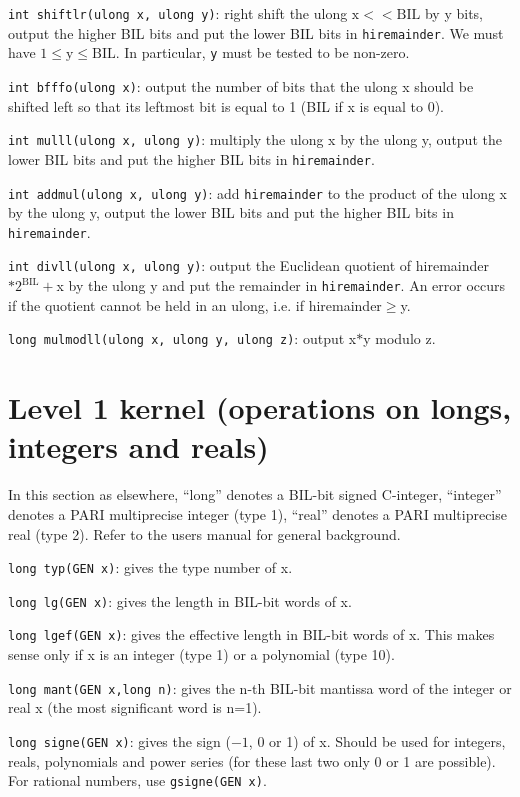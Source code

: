 {\tt int shiftlr(ulong x, ulong y)}: right shift the ulong $\text{x}<<\text{BIL}$ by
y bits, output the higher BIL bits and put the lower BIL bits in 
{\tt hiremainder}. We must have $1\le\text{y}\le\text{BIL}$. In
particular, {\tt y} must be tested to be non-zero.

{\tt int bfffo(ulong x)}: output the number of bits that the ulong x should
be shifted left so that its leftmost bit is equal to 1 (BIL if x is equal to 0).

{\tt int mulll(ulong x, ulong y)}: multiply the ulong x by the ulong y, output
the lower BIL bits and put the higher BIL bits in {\tt hiremainder}.

{\tt int addmul(ulong x, ulong y)}: add {\tt hiremainder} to the product of
the ulong x by the ulong y, output the lower BIL bits and put the higher BIL
bits in {\tt hiremainder}.

{\tt int divll(ulong x, ulong y)}: output the Euclidean quotient of 
hiremainder$*2^{\text{BIL}}+$x by the ulong y and put the remainder in 
{\tt hiremainder}. An error occurs if the quotient cannot be held in
an ulong, i.e. if hiremainder$\ge$y.

{\tt long mulmodll(ulong x, ulong y, ulong z)}: output x$*$y modulo z.

\section{Level 1 kernel (operations on longs, integers and reals)}
In this section as elsewhere, ``long'' denotes a BIL-bit signed C-integer,
``integer'' denotes a PARI multiprecise integer (type 1), ``real'' denotes
a PARI multiprecise real (type 2). Refer to the users manual for general
background.


{\tt long typ(GEN x)}: gives the type number of x.

{\tt long lg(GEN x)}: gives the length in BIL-bit words of x.

{\tt long lgef(GEN x)}: gives the effective length in BIL-bit words of x. This
makes sense only if x is an integer (type 1) or a polynomial (type 10).

{\tt long mant(GEN x,long n)}: gives the n-th BIL-bit mantissa word of the 
integer or real x (the most significant word is n=1).

{\tt long signe(GEN x)}: gives the sign ($-1$, 0 or 1) of x. Should be used
for integers, reals, polynomials and power series (for these last two only 0 
or 1 are possible). For rational numbers, use {\tt gsigne(GEN x)}.

